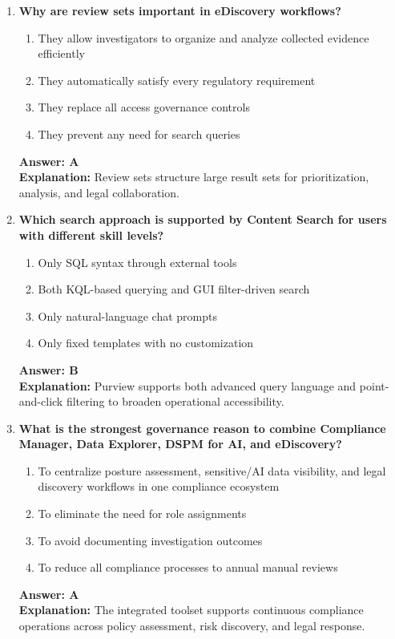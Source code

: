 \documentclass[10pt]{article}
\begin{document}
\begin{enumerate}[leftmargin=*]
\item \textbf{Why are review sets important in eDiscovery workflows?}
\begin{enumerate}[label=\Alph*.]
  \item They allow investigators to organize and analyze collected evidence efficiently
  \item They automatically satisfy every regulatory requirement
  \item They replace all access governance controls
  \item They prevent any need for search queries
\end{enumerate}
\textbf{Answer: A}\\
\textbf{Explanation:} Review sets structure large result sets for prioritization, analysis, and legal collaboration.

\item \textbf{Which search approach is supported by Content Search for users with different skill levels?}
\begin{enumerate}[label=\Alph*.]
  \item Only SQL syntax through external tools
  \item Both KQL-based querying and GUI filter-driven search
  \item Only natural-language chat prompts
  \item Only fixed templates with no customization
\end{enumerate}
\textbf{Answer: B}\\
\textbf{Explanation:} Purview supports both advanced query language and point-and-click filtering to broaden operational accessibility.

\item \textbf{What is the strongest governance reason to combine Compliance Manager, Data Explorer, DSPM for AI, and eDiscovery?}
\begin{enumerate}[label=\Alph*.]
  \item To centralize posture assessment, sensitive/AI data visibility, and legal discovery workflows in one compliance ecosystem
  \item To eliminate the need for role assignments
  \item To avoid documenting investigation outcomes
  \item To reduce all compliance processes to annual manual reviews
\end{enumerate}
\textbf{Answer: A}\\
\textbf{Explanation:} The integrated toolset supports continuous compliance operations across policy assessment, risk discovery, and legal response.


\end{enumerate}
\end{document}
